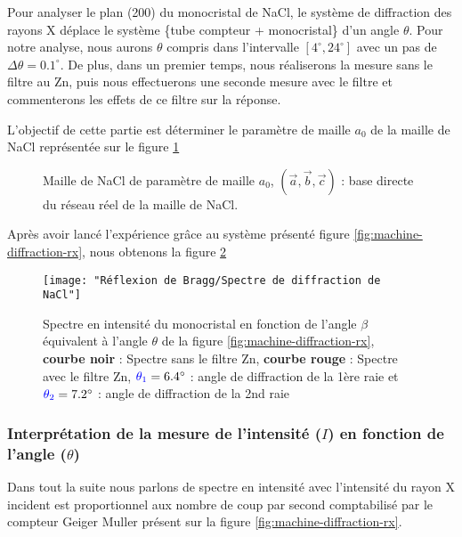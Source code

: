Pour analyser le plan (200) du monocristal de NaCl, le système de diffraction des rayons X déplace le système \{tube compteur + monocristal\} d'un angle $\theta$. Pour notre analyse, nous aurons $\theta$ compris dans l'intervalle $[4^\circ, 24^\circ]$ avec un pas de $\Delta \theta = 0.1^\circ$. De plus, dans un premier temps, nous réaliserons la mesure sans le filtre au Zn, puis nous effectuerons une seconde mesure avec le filtre et commenterons les effets de ce filtre sur la réponse.












\newpage

L'objectif de cette partie est déterminer le paramètre de maille $a_0$ de la maille de NaCl représentée sur le figure \ref{fig:cristalnacl}
\begin{figure}[h!]
	\centering
	
	\caption{\centering Maille de NaCl de paramètre de maille $a_0$, $\left(\vec{a}, \vec{b}, \vec{c}\right)$ : base directe du réseau réel de la maille de NaCl.}
	\label{fig:cristalnacl}
\end{figure}







Après avoir lancé l'expérience grâce au système présenté figure \ref{fig:machine-diffraction-rx}, nous obtenons la figure \ref{fig:spectre-de-diffraction-de-nacl}





\begin{figure}[h!]
	\centering
	\texttt{[image: "Réflexion de Bragg/Spectre de diffraction de NaCl"]}
	\caption{\centering Spectre en intensité du monocristal en fonction de l'angle $\beta$ équivalent à l'angle $\theta$ de la figure \ref{fig:machine-diffraction-rx}, \textbf{courbe noir} : Spectre sans le filtre Zn, {\color{red}\textbf{courbe rouge}} : Spectre avec le filtre Zn, $ {\color{blue} \theta_1} = 6.4^\circ$ : angle de diffraction de la 1ère raie et $ {\color{blue} \theta_2}=7.2^\circ$ : angle de diffraction de la 2nd raie  }
	\label{fig:spectre-de-diffraction-de-nacl}
\end{figure}



	
\subsubsection{Interprétation de la mesure de l’intensité ($I$) en fonction de l’angle ($\theta$)}
Dans tout la suite nous parlons de spectre en intensité avec l'intensité du rayon X incident est proportionnel aux nombre de coup par second comptabilisé par le compteur Geiger Muller présent sur la figure \ref{fig:machine-diffraction-rx}.
	
